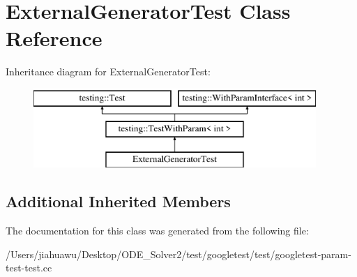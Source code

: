 \hypertarget{class_external_generator_test}{}\section{External\+Generator\+Test Class Reference}
\label{class_external_generator_test}
Inheritance diagram for External\+Generator\+Test\+:\begin{figure}[H]
\begin{center}
\leavevmode
\includegraphics[height=3.000000cm]{class_external_generator_test}
\end{center}
\end{figure}
\subsection*{Additional Inherited Members}


The documentation for this class was generated from the following file\+:\begin{DoxyCompactItemize}
\item 
/\+Users/jiahuawu/\+Desktop/\+O\+D\+E\+\_\+\+Solver2/test/googletest/test/googletest-\/param-\/test-\/test.\+cc\end{DoxyCompactItemize}
